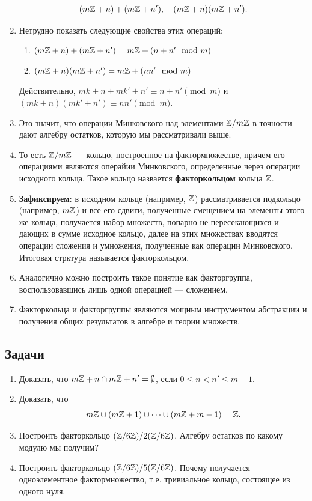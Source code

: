 \begin{enumerate}
$$
(m\mathbb Z+n)+(m\mathbb Z+n'),\quad (m\mathbb Z+n)(m\mathbb Z+n').
$$
\item Нетрудно показать следующие свойства этих операций:
\begin{enumerate}[Z1]
\item $(m\mathbb Z+n)+(m\mathbb Z+n') = m\mathbb Z+(n+n'\mod m)$
\item $(m\mathbb Z+n)(m\mathbb Z+n') = m\mathbb Z+(nn'\mod m)$
\end{enumerate}
Действительно, $mk+n+mk'+n'\equiv n+n'\pmod m$ и $(mk+n)(mk'+n')\equiv nn'\pmod m$.
\item Это значит, что операции Минковского над элементами $\mathbb Z/m\mathbb Z$ в точности дают алгебру остатков, которую мы рассматривали выше.
\item То есть $\mathbb Z/m\mathbb Z$ --- кольцо, построенное на фактормножестве, причем его операциями являются операйии Минковского, определенные через операции исходного кольца. Такое кольцо назвается \textbf{факторкольцом} кольца $\mathbb Z$.
\item \textbf{Зафиксируем}: в исходном кольце (например, $\mathbb Z$) рассматривается подкольцо (например, $m\mathbb Z$) и все его сдвиги, полученные смещением на элементы этого же кольца, получается набор множеств, попарно не пересекающихся и дающих в сумме исходное кольцо, далее на этих множествах вводятся операции сложения и умножения, полученные как операции Минковского. Итоговая стрктура называется факторкольцом.
\item Аналогично можно построить такое понятие как факторгруппа, воспользовавшись лишь одной операцией --- сложением.
\item Факторкольца и факторгруппы являются мощным инструментом абстракции и получения общих результатов в алгебре и теории множеств.
\end{enumerate}


\subsection*{Задачи}
\begin{enumerate}
\item Доказать, что $m\mathbb Z+n\cap m\mathbb Z+n'=\emptyset$, если $0\le n<n'\le m-1$.
\item Доказать, что
$$
m\mathbb Z\cup (m\mathbb Z+1)\cup\dots\cup (m\mathbb Z+m-1) = \mathbb Z.
$$
\item Построить факторкольцо $(\mathbb Z/6\mathbb Z)/2(\mathbb Z/6\mathbb Z)$. Алгебру остатков по какому модулю мы получим?
\item Построить факторкольцо $(\mathbb Z/6\mathbb Z)/5(\mathbb Z/6\mathbb Z)$. Почему получается одноэлементное фактормножество, т.е. тривиальное кольцо, состоящее из одного нуля.
\end{enumerate}

